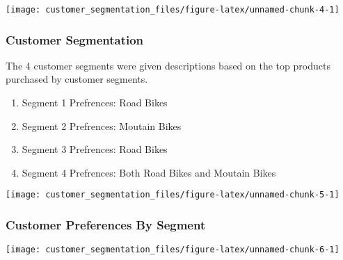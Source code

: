 \documentclass[
]{article}
\begin{document}
\begin{center}\texttt{[image: customer\_segmentation\_files/figure-latex/unnamed-chunk-4-1]} \end{center}

\hypertarget{customer-segmentation}{%
\subsubsection{Customer Segmentation}\label{customer-segmentation}}

The 4 customer segments were given descriptions based on the top
products purchased by customer segments.

\begin{enumerate}
\def\labelenumi{\arabic{enumi}.}
\item
  Segment 1 Prefrences: Road Bikes
\item
  Segment 2 Prefrences: Moutain Bikes
\item
  Segment 3 Prefrences: Road Bikes
\item
  Segment 4 Prefrences: Both Road Bikes and Moutain Bikes
\end{enumerate}

\begin{center}\texttt{[image: customer\_segmentation\_files/figure-latex/unnamed-chunk-5-1]} \end{center}

\hypertarget{customer-preferences-by-segment}{%
\subsubsection{Customer Preferences By
Segment}\label{customer-preferences-by-segment}}

\begin{center}\texttt{[image: customer\_segmentation\_files/figure-latex/unnamed-chunk-6-1]} \end{center}
\end{document}

